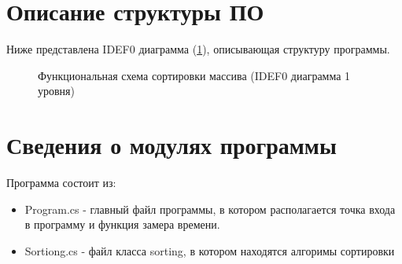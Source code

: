 \documentclass[12pt]{report}
\begin{document}
\section{Описание структуры ПО}
Ниже представлена IDEF0 диаграмма (\ref{ris:imageIDEF}), описывающая структуру программы.
\begin{figure}[h]
\caption{Функциональная схема сортировки массива (IDEF0 диаграмма 1 уровня)}
\label{ris:imageIDEF}
\end{figure}

\section{Сведения о модулях программы}
Программа состоит из:
\begin{itemize}
	\item Program.cs - главный файл программы, в котором располагается точка входа в программу и функция замера времени.
	\item Sortiong.cs - файл класса sorting, в котором находятся алгоримы сортировки
\end{itemize}
\end{document}
